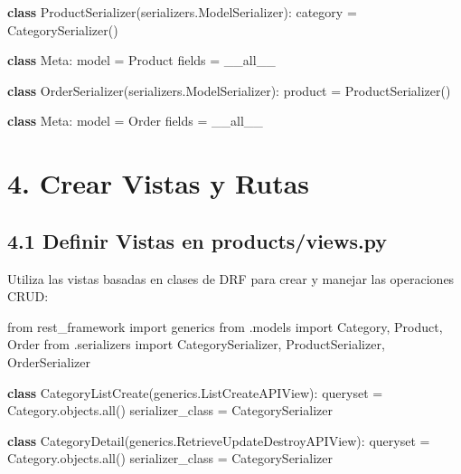 \documentclass[
  a4paper,
  DIV=11,
  numbers=noendperiod,
  onepage,
  openany]{scrreprt}
\newenvironment{Shaded}{\begin{snugshade}}{\end{snugshade}}
\newcommand{\BuiltInTok}[1]{\textcolor[rgb]{0.00,0.23,0.31}{#1}}
\newcommand{\ImportTok}[1]{\textcolor[rgb]{0.00,0.46,0.62}{#1}}
\newcommand{\KeywordTok}[1]{\textcolor[rgb]{0.00,0.23,0.31}{\textbf{#1}}}
\newcommand{\NormalTok}[1]{\textcolor[rgb]{0.00,0.23,0.31}{#1}}
\newcommand{\OperatorTok}[1]{\textcolor[rgb]{0.37,0.37,0.37}{#1}}
\newcommand{\StringTok}[1]{\textcolor[rgb]{0.13,0.47,0.30}{#1}}
\begin{document}
\begin{tcolorbox}
\begin{Shaded}
\begin{Highlighting}[]
\KeywordTok{class}\NormalTok{ ProductSerializer(serializers.ModelSerializer):}
\NormalTok{    category }\OperatorTok{=}\NormalTok{ CategorySerializer()}

    \KeywordTok{class}\NormalTok{ Meta:}
\NormalTok{        model }\OperatorTok{=}\NormalTok{ Product}
\NormalTok{        fields }\OperatorTok{=} \StringTok{\textquotesingle{}\_\_all\_\_\textquotesingle{}}

\KeywordTok{class}\NormalTok{ OrderSerializer(serializers.ModelSerializer):}
\NormalTok{    product }\OperatorTok{=}\NormalTok{ ProductSerializer()}

    \KeywordTok{class}\NormalTok{ Meta:}
\NormalTok{        model }\OperatorTok{=}\NormalTok{ Order}
\NormalTok{        fields }\OperatorTok{=} \StringTok{\textquotesingle{}\_\_all\_\_\textquotesingle{}}
\end{Highlighting}
\end{Shaded}

\section{4. Crear Vistas y Rutas}\label{crear-vistas-y-rutas}

\subsection{4.1 Definir Vistas en
products/views.py}\label{definir-vistas-en-productsviews.py}

Utiliza las vistas basadas en clases de DRF para crear y manejar las
operaciones CRUD:

\begin{Shaded}
\begin{Highlighting}[]
\ImportTok{from}\NormalTok{ rest\_framework }\ImportTok{import}\NormalTok{ generics}
\ImportTok{from}\NormalTok{ .models }\ImportTok{import}\NormalTok{ Category, Product, Order}
\ImportTok{from}\NormalTok{ .serializers }\ImportTok{import}\NormalTok{ CategorySerializer, ProductSerializer, OrderSerializer}

\KeywordTok{class}\NormalTok{ CategoryListCreate(generics.ListCreateAPIView):}
\NormalTok{    queryset }\OperatorTok{=}\NormalTok{ Category.objects.}\BuiltInTok{all}\NormalTok{()}
\NormalTok{    serializer\_class }\OperatorTok{=}\NormalTok{ CategorySerializer}

\KeywordTok{class}\NormalTok{ CategoryDetail(generics.RetrieveUpdateDestroyAPIView):}
\NormalTok{    queryset }\OperatorTok{=}\NormalTok{ Category.objects.}\BuiltInTok{all}\NormalTok{()}
\NormalTok{    serializer\_class }\OperatorTok{=}\NormalTok{ CategorySerializer}


\end{Highlighting}
\end{Shaded}
\end{tcolorbox}
\end{document}
